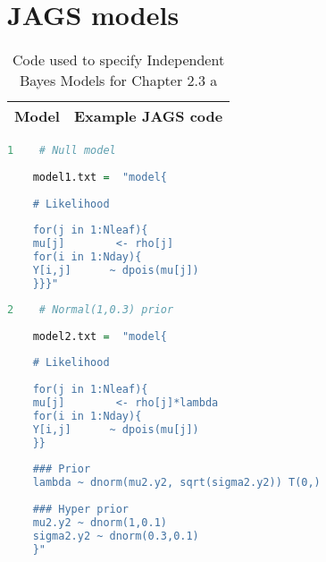 \newpage %
\section{JAGS models}\label{models}

\begin{table}[!htb]
	\caption{Code used to specify Independent Bayes Models for Chapter 2.3 a}
	
	\begin{tabularx}{\textwidth}{rX}
		\toprule
		Model & Example JAGS code\\
		\bottomrule
	\end{tabularx}
	
	\begin{lstlisting}[language=R, showstringspaces=false]
	1    # Null model
	
	model1.txt =  "model{
	
	# Likelihood
	
	for(j in 1:Nleaf){
	mu[j]        <- rho[j]
	for(i in 1:Nday){
	Y[i,j]      ~ dpois(mu[j])
	}}}"
	\end{lstlisting}
	\intexthline
	\begin{lstlisting}[language=R, showstringspaces=false]
	2    # Normal(1,0.3) prior
	
	model2.txt =  "model{
	
	# Likelihood
	
	for(j in 1:Nleaf){
	mu[j]        <- rho[j]*lambda
	for(i in 1:Nday){
	Y[i,j]      ~ dpois(mu[j])
	}}
	
	### Prior
	lambda ~ dnorm(mu2.y2, sqrt(sigma2.y2)) T(0,) 
	
	### Hyper prior
	mu2.y2 ~ dnorm(1,0.1)   
	sigma2.y2 ~ dnorm(0.3,0.1)
	}"
	
	\end{lstlisting}
\end{table}

\newpage

